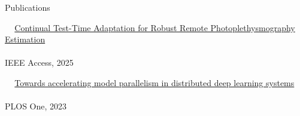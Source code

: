\documentclass{resume} %
\begin{document}


\vskip -0.3in

\small



\begin{rSection}{Publications {}}

\textbullet~\,\, \href{https://ieeexplore.ieee.org/document/10938539}{Continual Test-Time Adaptation for Robust Remote Photoplethysmography Estimation}
\\ 
\\ \hspace*{1.5em}IEEE Access, 2025


\textbullet~\,\, \href{https://journals.plos.org/plosone/article?id=10.1371/journal.pone.0293338}{Towards accelerating model parallelism in distributed deep learning systems}
\\ 
\\ \hspace*{1.5em}PLOS One, 2023

\end{rSection} 
\end{document}
